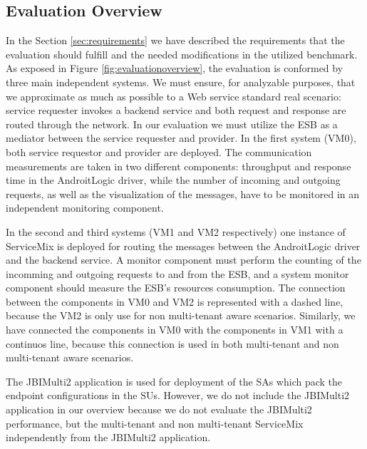 \subsection{Evaluation Overview}
\label{sec:evaluationoverview}

% 
In the Section \ref{sec:requirements} we have described the requirements that the evaluation should fulfill and the needed modifications in the utilized benchmark. As exposed in Figure \ref{fig:evaluationoverview}, the evaluation is conformed by three main independent systems. We must ensure, for analyzable purposes, that we approximate as much as possible to a Web service standard real scenario: service requester invokes a backend service and both request and response are routed through the network. In our evaluation we must utilize the \ac{ESB} as a mediator between the service requester and provider. In the first system (VM0), both service requestor and provider are deployed. The communication measurements are taken in two different components: throughput and response time in the AndroitLogic driver, while the number of incoming and outgoing requests, as well as the visualization of the messages, have to be monitored in an independent monitoring component. 

In the second and third systems (VM1 and VM2 respectively) one instance of ServiceMix is deployed for routing the messages between the AndroitLogic driver and the backend service. A monitor component must perform the counting of the incomming and outgoing requests to and from the \ac{ESB}, and a system monitor component should measure the \ac{ESB}'s resources consumption. The connection between the components in VM0 and VM2 is represented with a dashed line, because the VM2 is only use for non multi-tenant aware scenarios. Similarly, we have connected the components in VM0 with the components in VM1 with a continuos line, because this connection is used in both multi-tenant and non multi-tenant aware scenarios. 

The JBIMulti2 application is used for deployment of the \ac{SA}s which pack the endpoint configurations in the \ac{SU}s. However, we do not include the JBIMulti2 application in our overview because we do not evaluate the JBIMulti2 performance, but the multi-tenant and non multi-tenant ServiceMix independently from the JBIMulti2 application.

